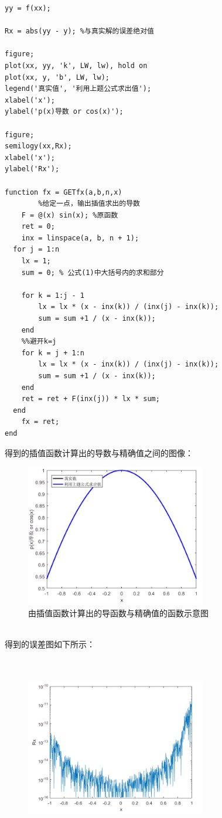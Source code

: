 \documentclass[12pt,a4paper,utf8]{ctexart}
\begin{document}
\begin{enumerate}
\begin{enumerate}
\begin{lstlisting}[frame=single]
yy = f(xx);

Rx = abs(yy - y); %与真实解的误差绝对值

figure;
plot(xx, yy, 'k', LW, lw), hold on
plot(xx, y, 'b', LW, lw);
legend('真实值', '利用上题公式求出值');
xlabel('x');
ylabel('p(x)导数 or cos(x)');

figure;
semilogy(xx,Rx);
xlabel('x');
ylabel('Rx');

function fx = GETfx(a,b,n,x)
        %给定一点，输出插值求出的导数
    F = @(x) sin(x); %原函数
    ret = 0;
    inx = linspace(a, b, n + 1);
  for j = 1:n
    lx = 1;
    sum = 0; % 公式(1)中大括号内的求和部分
    
    for k = 1:j - 1
        lx = lx * (x - inx(k)) / (inx(j) - inx(k));
        sum = sum +1 / (x - inx(k));
    end
    %%避开k=j
    for k = j + 1:n
        lx = lx * (x - inx(k)) / (inx(j) - inx(k));
        sum = sum +1 / (x - inx(k));
    end
    ret = ret + F(inx(j)) * lx * sum;
  end    
    fx = ret;
end
\end{lstlisting}
        \quad \quad 得到的插值函数计算出的导数与精确值之间的图像：
        \begin{figure}[h]
            \centering
            \includegraphics[width=0.7\textwidth]{T2B1.JPG}
            \caption{由插值函数计算出的导函数与精确值的函数示意图}
        \end{figure}\\
            得到的误差图如下所示：\\
            \\
            \\
        \begin{figure}[h]
              \centering
              \includegraphics[width=0.7\textwidth]{T2B2.JPG}

\end{figure}
\end{enumerate}
\end{enumerate}
\end{document}

